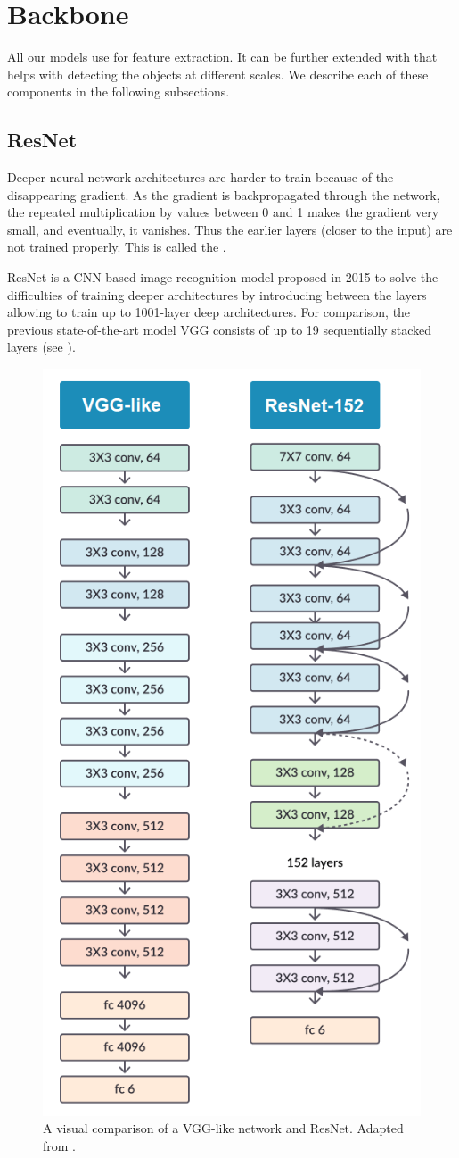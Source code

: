 \section{Backbone}
All our models use  \cite{resnet} for feature extraction. It
can be further extended with  \cite{fpn}
that helps with detecting the objects at different scales. We describe each
of these components in the following subsections.

\subsection{ResNet}
Deeper neural network architectures are harder to train because of the
disappearing gradient. As the gradient is backpropagated through the network,
the repeated multiplication by values between 0 and 1 makes the gradient
very small, and eventually, it vanishes. Thus the earlier layers (closer
to the input) are not trained properly. This is called the .

ResNet is a CNN-based image recognition model proposed in 2015 \cite{resnet}
to solve the difficulties of training deeper architectures by introducing
 between the layers allowing to train up to 1001-layer
deep architectures. For comparison, the previous state-of-the-art model
VGG \cite{vgg} consists of up to 19 sequentially stacked layers (see
).

\begin{figure}[h]
    \centering
    \includegraphics[width=0.4\linewidth]{Sources/Figures/vgg_resnet.png}
    \caption{A visual comparison of a VGG-like network and ResNet. Adapted from
        \cite{resnet}.}
    \label{fig:vgg_resnet}
\end{figure}

